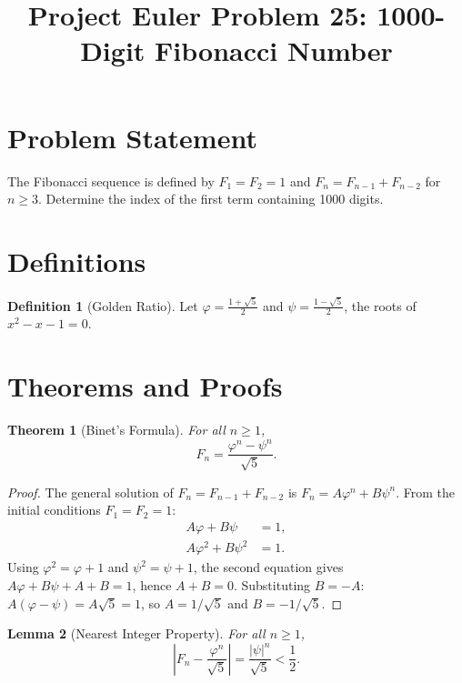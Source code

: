 \documentclass[12pt,a4paper]{article}
\title{Project Euler Problem 25: 1000-Digit Fibonacci Number}
\author{}
\date{}
\newtheorem{theorem}{Theorem}
\newtheorem{lemma}[theorem]{Lemma}
\theoremstyle{definition}
\newtheorem{definition}{Definition}
\begin{document}
\maketitle

\section{Problem Statement}

The Fibonacci sequence is defined by $F_1 = F_2 = 1$ and $F_n = F_{n-1} + F_{n-2}$ for $n \geq 3$. Determine the index of the first term containing 1000 digits.

\section{Definitions}

\begin{definition}[Golden Ratio]
Let $\varphi = \frac{1+\sqrt{5}}{2}$ and $\psi = \frac{1-\sqrt{5}}{2}$, the roots of $x^2 - x - 1 = 0$.
\end{definition}

\section{Theorems and Proofs}

\begin{theorem}[Binet's Formula]
For all $n \geq 1$,
\[
F_n = \frac{\varphi^n - \psi^n}{\sqrt{5}}.
\]
\end{theorem}

\begin{proof}
The general solution of $F_n = F_{n-1} + F_{n-2}$ is $F_n = A\varphi^n + B\psi^n$. From the initial conditions $F_1 = F_2 = 1$:
\begin{align}
A\varphi + B\psi &= 1, \\
A\varphi^2 + B\psi^2 &= 1.
\end{align}
Using $\varphi^2 = \varphi + 1$ and $\psi^2 = \psi + 1$, the second equation gives $A\varphi + B\psi + A + B = 1$, hence $A + B = 0$. Substituting $B = -A$: $A(\varphi - \psi) = A\sqrt{5} = 1$, so $A = 1/\sqrt{5}$ and $B = -1/\sqrt{5}$.
\end{proof}

\begin{lemma}[Nearest Integer Property]
For all $n \geq 1$,
\[
\left|F_n - \frac{\varphi^n}{\sqrt{5}}\right| = \frac{|\psi|^n}{\sqrt{5}} < \frac{1}{2}.
\]
\end{lemma}
\end{document}
